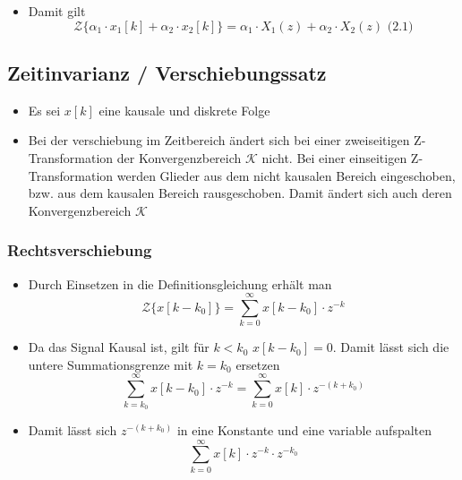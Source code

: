 \documentclass[11pt]{article}
\providecommand{\tightlist}{%
      \setlength{\itemsep}{0pt}\setlength{\parskip}{0pt}}
\def\lt{<}
\begin{document}
    \begin{itemize}
\tightlist
\item
  Damit gilt
  \[\mathcal{Z}\{\alpha_1 \cdot x_1[k] + \alpha_2 \cdot x_2[k]\} = \alpha_1 \cdot X_1(z) + \alpha_2 \cdot X_2(z)\textrm{  (2.1)}\]
\end{itemize}

    \subsection{Zeitinvarianz /
Verschiebungssatz}\label{zeitinvarianz-verschiebungssatz}

\begin{itemize}
\item
  Es sei \(x[k]\) eine kausale und diskrete Folge
\item
  Bei der verschiebung im Zeitbereich ändert sich bei einer zweiseitigen
  Z-Transformation der Konvergenzbereich \(\mathcal{K}\) nicht. Bei
  einer einseitigen Z-Transformation werden Glieder aus dem nicht
  kausalen Bereich eingeschoben, bzw. aus dem kausalen Bereich
  rausgeschoben. Damit ändert sich auch deren Konvergenzbereich
  \(\mathcal{K}\)
\end{itemize}

    \subsubsection{Rechtsverschiebung}\label{rechtsverschiebung}

\begin{itemize}
\tightlist
\item
  Durch Einsetzen in die Definitionsgleichung erhält man
  \[\mathcal{Z}\{x[k-k_0]\} = \sum_{k=0}^\infty x[k-k_0] \cdot z^{-k}\]
\end{itemize}

    \begin{itemize}
\tightlist
\item
  Da das Signal Kausal ist, gilt für \(k \lt k_0\) \(x[k-k_0] = 0\).
  Damit lässt sich die untere Summationsgrenze mit \(k=k_0\) ersetzen
  \[\sum_{k=k_0}^\infty x[k-k_0] \cdot z^{-k} = \sum_{k=0}^\infty x[k] \cdot z^{-(k+k_0)}\]
\end{itemize}

    \begin{itemize}
\tightlist
\item
  Damit lässt sich \(z^{-(k+k_0)}\) in eine Konstante und eine variable
  aufspalten \[\sum_{k=0}^\infty x[k] \cdot z^{-k} \cdot z^{-k_0}\]
\end{itemize}
\end{document}
